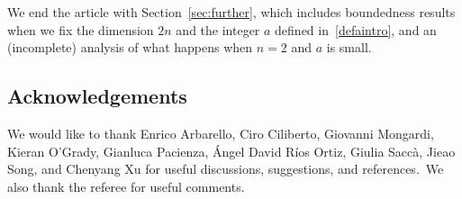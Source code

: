 We end the article with Section~\ref{sec:further}, which includes boundedness results when we fix the dimension $2n$ and the integer $a$ defined in~\eqref{defaintro}, and an (incomplete) analysis  of what happens when $n=2$ and $a$ is small.


\subsection*{Acknowledgements}
We would like to thank Enrico Arbarello, Ciro Ciliberto, Giovanni Mongardi, Kieran O'Grady, Gianluca Pacienza, \'Angel David R\'ios Ortiz, Giulia Sacc\`a, Jieao Song, and Chenyang Xu for useful discussions, suggestions, and references.\ We also thank the referee for useful comments.


